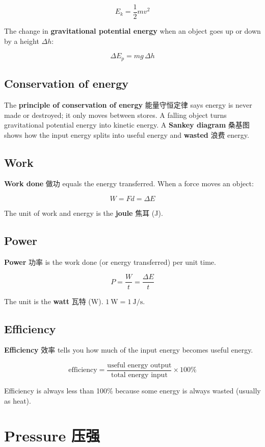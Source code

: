 \documentclass[11pt]{article}
\begin{document}
\[
E_k = \frac{1}{2}mv^2
\]

The change in \textbf{gravitational potential energy} when an object goes up or down by a height $\Delta h$:

\[
\Delta E_p = mg\,\Delta h
\]

\subsection*{Conservation of energy}

The \textbf{principle of conservation of energy} 能量守恒定律 says energy is never made or destroyed; it only moves between stores. A falling object turns gravitational potential energy into kinetic energy. A \textbf{Sankey diagram} 桑基图 shows how the input energy splits into useful energy and \textbf{wasted} 浪费 energy.

\subsection*{Work}

\textbf{Work done} 做功 equals the energy transferred. When a force moves an object:

\[
W = Fd = \Delta E
\]

The unit of work and energy is the \textbf{joule} 焦耳 (J).

\subsection*{Power}

\textbf{Power} 功率 is the work done (or energy transferred) per unit time.

\[
P = \frac{W}{t} = \frac{\Delta E}{t}
\]

The unit is the \textbf{watt} 瓦特 (W). $1\ \text{W} = 1\ \text{J/s}$.

\subsection*{Efficiency}

\textbf{Efficiency} 效率 tells you how much of the input energy becomes useful energy.

\[
\text{efficiency} = \frac{\text{useful energy output}}{\text{total energy input}} \times 100\%
\]

Efficiency is always less than 100\% because some energy is always wasted (usually as heat).

\section*{Pressure 压强}
\end{document}
